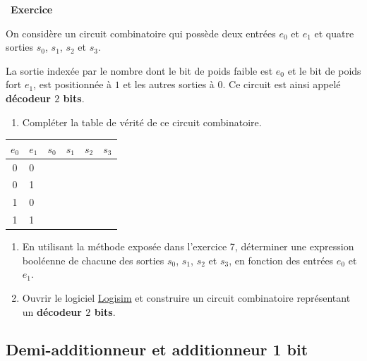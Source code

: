 \documentclass[
  11pt,
]{article}
\providecommand{\tightlist}{%
  \setlength{\itemsep}{0pt}\setlength{\parskip}{0pt}}
\newcounter{exo}
\newenvironment{exercice}[1]
{\par \medskip   \addtocounter{exo}{1} \noindent  
\begin{bclogo}[arrondi =0.1,   noborder = true, logo=\bccrayon, marge=4]{~\textbf{Exercice} \textbf{\theexo} {\itshape #1} }  \par}
{
\end{bclogo}
 \par \bigskip }
\newcounter{def}
\newcounter{logi}
\begin{document}
\begin{exercice}{}

On considère un circuit combinatoire qui possède deux entrées \(e_{0}\)
et \(e_{1}\) et quatre sorties \(s_{0}\), \(s_{1}\), \(s_{2}\) et
\(s_{3}\).

La sortie indexée par le nombre dont le bit de poids faible est
\(e_{0}\) et le bit de poids fort \(e_{1}\), est positionnée à \(1\) et
les autres sorties à \(0\). Ce circuit est ainsi appelé \textbf{décodeur
\(2\) bits}.

\begin{enumerate}
\def\labelenumi{\arabic{enumi}.}
\tightlist
\item
  Compléter la table de vérité de ce circuit combinatoire.
\end{enumerate}

\begin{longtable}[]{@{}clllll@{}}
\toprule
\(e_{0}\) & \(e_{1}\) & \(s_{0}\) & \(s_{1}\) & \(s_{2}\) &
\(s_{3}\)\tabularnewline
\midrule
\endhead
0 & 0 & & & &\tabularnewline
0 & 1 & & & &\tabularnewline
1 & 0 & & & &\tabularnewline
1 & 1 & & & &\tabularnewline
\bottomrule
\end{longtable}

\begin{enumerate}
\def\labelenumi{\arabic{enumi}.}
\setcounter{enumi}{1}
\item
  En utilisant la méthode exposée dans l'exercice 7, déterminer une
  expression booléenne de chacune des sorties \(s_{0}\), \(s_{1}\),
  \(s_{2}\) et \(s_{3}\), en fonction des entrées \(e_{0}\) et
  \(e_{1}\).
\item
  Ouvrir le logiciel \href{http://www.cburch.com/logisim/}{Logisim} et
  construire un circuit combinatoire représentant un \textbf{décodeur
  \(2\) bits}.
\end{enumerate}

\end{exercice}

\hypertarget{demi-additionneur-et-additionneur-1-bit}{%
\subsection{Demi-additionneur et additionneur 1
bit}\label{demi-additionneur-et-additionneur-1-bit}}
\end{document}
